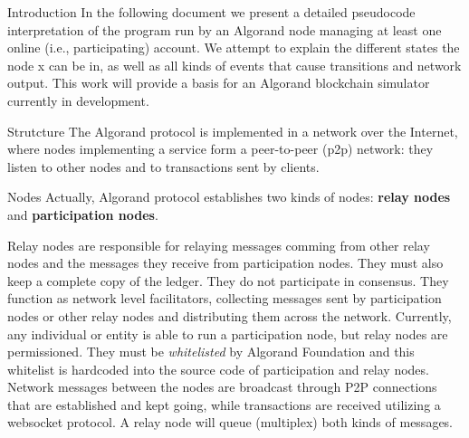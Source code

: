 \documentclass[10pt,a4paper]{article}
\begin{document}
\begin{section}{Introduction}
In the following document we present a detailed pseudocode interpretation 
of the program run by an Algorand node managing at least one online (i.e., 
participating) account. We attempt to explain the different states the node x
can be in, as well as all kinds of events that cause transitions and network 
output. This work will provide a basis for an Algorand blockchain simulator 
currently in development.

\end{section}
\begin{section}{Strutcture}
The Algorand protocol is implemented in a network over the Internet, where nodes 
implementing a service form a peer-to-peer (p2p) network: they listen to other nodes 
and to transactions sent by clients.

\begin{subsection}{Nodes}
Actually, Algorand protocol establishes two kinds of nodes: 
{\bf relay nodes} and {\bf participation nodes}.

Relay nodes are responsible for relaying messages comming from other relay nodes
and the messages they receive from participation nodes. 
They must also keep a complete copy of the ledger. 
They do not participate in consensus.
They function as network level facilitators, collecting messages sent by participation
nodes or other relay nodes and distributing them across the network.
Currently, any individual or entity is able to run a participation node, 
but relay nodes are permissioned. They must be {\em whitelisted} by 
Algorand Foundation and this whitelist is hardcoded into the source 
code of participation and relay nodes.
Network messages between the nodes are broadcast through P2P connections that are
established and kept going, while transactions are received utilizing a websocket 
protocol.
A relay node will queue (multiplex) both kinds of messages.


\end{subsection}
\end{section}
\end{document}
